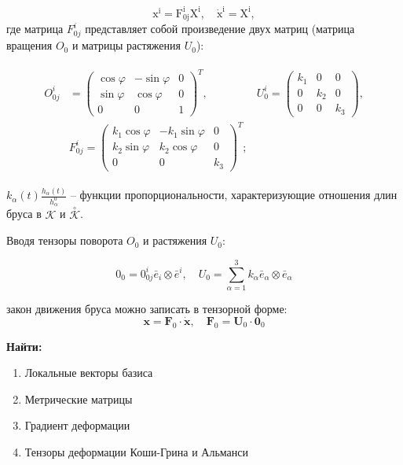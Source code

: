 \documentclass[14pt,a4paper]{scrartcl}
\begin{document}
\begin{equation*}
	\mathrm{x}^{\mathrm{i}}=\mathrm{F}_{0 \mathrm{j}}^{\mathrm{i}} \mathrm{X}^{\mathrm{i}}, \quad \dot{\mathrm{x}}^{\mathrm{i}}=\mathrm{X}^{\mathrm{i}},
\end{equation*}
где матрица $F_{0j}^i$ представляет собой произведение двух матриц (матрица вращения $O_0$ и матрицы растяжения $U_0$):

\begin{align*}
	\begin{aligned}
	O_{0 j}^{i}&=\left(\begin{array}{ccc}
	\cos \varphi & -\sin \varphi & 0 \\
	\sin \varphi & \cos \varphi & 0 \\
	0 & 0 & 1
	\end{array}\right)^{T}, & U_{0}^{i}=\left(\begin{array}{ccc}
	k_{1} & 0 & 0 \\
	0 & k_{2} & 0 \\
	0 & 0 & k_{3}
	\end{array}\right),  \\
	& F_{0 j}^{i} = \left(\begin{array}{ccc}
	k_{1} \cos \varphi & -k_{1} \sin \varphi & 0 \\
	k_{2} \sin \varphi & k_{2} \cos \varphi & 0 \\
	0 & 0 & k_{3}
	\end{array}\right)^{T};
	\end{aligned}
\end{align*}

$k_\alpha(t)\frac{h_\alpha(t)}{h_\alpha^0}$ -- функции пропорциональности, характеризующие отношения длин бруса в $\mathcal{K}$ и $\mathcal{\overset{\circ}{K}}$.

Вводя тензоры поворота $O_0$ и растяжения $U_0$:

\begin{equation*}
	0_{0}=0_{0 j}^{i} \bar{e}_{i} \otimes \bar{e}^{i}, \quad U_{0}=\sum_{\alpha=1}^{3} k_{\alpha} \bar{e}_{\alpha} \otimes \bar{e}_{\alpha}
\end{equation*}

закон движения бруса можно записать в тензорной форме:
\begin{equation*}
	\mathbf{x}=\mathbf{F}_{0} \cdot \dot{\mathbf{x}}, \quad \mathbf{F}_{0}=\mathbf{U}_{0} \cdot \mathbf{0}_{0}
\end{equation*}

\textbf{Найти:}
\begin{enumerate}
	\item Локальные векторы базиса
	\item Метрические матрицы
	\item Градиент деформации
	\item Тензоры деформации Коши-Грина и Альманси
\end{enumerate}
\end{document}
